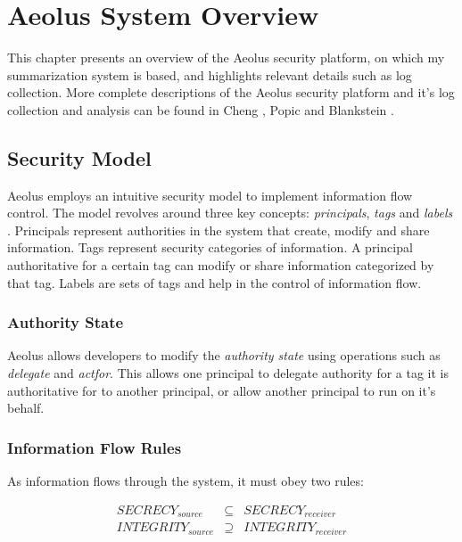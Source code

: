 \chapter{Aeolus System Overview}

This chapter presents an overview of the Aeolus security platform, on which my summarization system is based, and highlights relevant details such as log collection. More complete descriptions of the Aeolus security platform and it's log collection and analysis can be found in Cheng \cite{cheng}, Popic \cite{popic} and Blankstein \cite{blanks}.

\section{Security Model}

Aeolus employs an intuitive security model to implement information flow control. The model revolves around three key concepts: \emph{principals}, \emph{tags} and \emph{labels} \cite{aeolus}. Principals represent authorities in the system that create, modify and share information. Tags represent security categories of information. A principal authoritative for a certain tag can modify or share information categorized by that tag. Labels are sets of tags and help in the control of information flow.

\subsection{Authority State}

Aeolus allows developers to modify the \emph{authority state} using operations such as \emph{delegate} and \emph{actfor}. This allows one principal to delegate authority for a tag it is authoritative for to another principal, or allow another principal to run on it's behalf.

\subsection{Information Flow Rules}\label{difc:rules}

As information flows through the system, it must obey two rules:

\begin{eqnarray*}
  SECRECY_{source} &\subseteq& SECRECY_{receiver} \\
  INTEGRITY_{source} &\supseteq& INTEGRITY_{receiver}
\end{eqnarray*}

